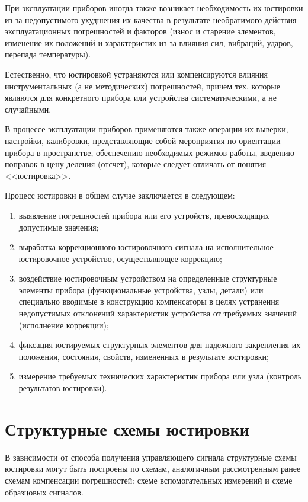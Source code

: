При эксплуатации приборов иногда также возникает необходимость их юстировки из-за недопустимого ухудшения их качества в результате необратимого действия эксплуатационных погрешностей и факторов (износ и старение элементов, изменение их положений и характеристик из-за влияния сил, вибраций, ударов, перепада температуры).

Естественно, что юстировкой устраняются или компенсируются влияния инструментальных (а не методических) погрешностей, причем тех, которые являются для конкретного прибора или устройства систематическими, а не случайными.

В процессе эксплуатации приборов применяются также операции их выверки, настройки, калибровки, представляющие собой мероприятия по ориентации прибора в пространстве, обеспечению необходимых режимов работы, введению поправок в цену деления (отсчет), которые следует отличать от понятия <<юстировка>>.

Процесс юстировки в общем случае заключается в следующем:
\begin{enumerate}
\item выявление погрешностей прибора или его устройств, превосходящих допустимые значения;
\item выработка коррекционного юстировочного сигнала на исполнительное юстировочное уст\-ройст\-во, осуществляющее коррекцию;
\item воздействие юстировочным устройством на определенные структурные элементы прибора (функциональные устройства, узлы, детали) или специально вводимые в конструкцию компенсаторы в целях устранения недопустимых отклонений характеристик устройства от требуемых значений (исполнение коррекции);
\item фиксация юстируемых структурных элементов для надежного закрепления их положения, состояния, свойств, измененных в результате юстировки;
\item измерение требуемых технических характеристик прибора или узла (контроль результатов юстировки).
\end{enumerate}

\section{Структурные схемы юстировки}

В зависимости от способа получения управляющего сигнала структурные схемы юстировки могут быть построены по схемам, аналогичным рассмотренным ранее схемам компенсации погрешностей: схеме вспомогательных измерений и схеме образцовых сигналов.

